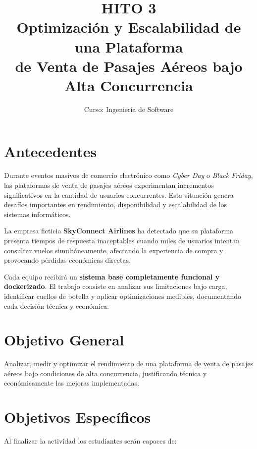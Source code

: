 \documentclass[12pt,a4paper]{article}
\title{
  \textbf{HITO 3}\\[0.4cm]
  \large Optimización y Escalabilidad de una Plataforma\\
  de Venta de Pasajes Aéreos bajo Alta Concurrencia
}
\author{Curso: Ingeniería de Software}
\date{}
\begin{document}

\maketitle
\thispagestyle{fancy}

\section{Antecedentes}

Durante eventos masivos de comercio electrónico como \textit{Cyber Day} o \textit{Black Friday}, las plataformas de venta de pasajes aéreos experimentan incrementos significativos en la cantidad de usuarios concurrentes. Esta situación genera desafíos importantes en rendimiento, disponibilidad y escalabilidad de los sistemas informáticos.

La empresa ficticia \textbf{SkyConnect Airlines} ha detectado que su plataforma presenta tiempos de respuesta inaceptables cuando miles de usuarios intentan consultar vuelos simultáneamente, afectando la experiencia de compra y provocando pérdidas económicas directas.

Cada equipo recibirá un \textbf{sistema base completamente funcional y dockerizado}. El trabajo consiste en analizar sus limitaciones bajo carga, identificar cuellos de botella y aplicar optimizaciones medibles, documentando cada decisión técnica y económica.

\section{Objetivo General}

Analizar, medir y optimizar el rendimiento de una plataforma de venta de pasajes aéreos bajo condiciones de alta concurrencia, justificando técnica y económicamente las mejoras implementadas.

\section{Objetivos Específicos}

Al finalizar la actividad los estudiantes serán capaces de:
\end{document}
